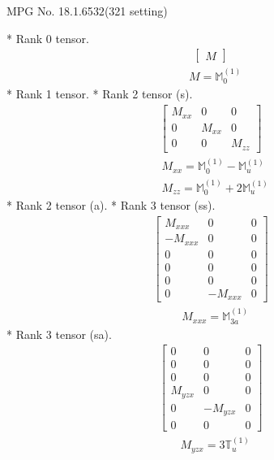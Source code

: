 \documentclass[fleqn,8pt,landscape]{jsarticle}
\begin{document}
\setcounter{MaxMatrixCols}{32}

\renewcommand{\tablename}{Table~}
\renewcommand{\figurename}{Figure~}
\begin{center}
\LARGE
MPG No. 18.1.65\quad$32$\quad(321 setting)
\end{center}
* Rank 0 tensor.
\begin{align*}
\begin{bmatrix} M \end{bmatrix}
\end{align*}
\begin{align*}
& M = \mathbb{M}_{0}^{(1)}
\end{align*}
* Rank 1 tensor.
* Rank 2 tensor (s).
\begin{align*}
\begin{bmatrix} M_{xx} & 0 & 0 \\ 0 & M_{xx} & 0 \\ 0 & 0 & M_{zz} \end{bmatrix}
\end{align*}
\begin{align*}
& M_{xx} = \mathbb{M}_{0}^{(1)} - \mathbb{M}_{u}^{(1)} \\
& M_{zz} = \mathbb{M}_{0}^{(1)} + 2 \mathbb{M}_{u}^{(1)}
\end{align*}
* Rank 2 tensor (a).
* Rank 3 tensor (ss).
\begin{align*}
\begin{bmatrix} M_{xxx} & 0 & 0 \\ - M_{xxx} & 0 & 0 \\ 0 & 0 & 0 \\ 0 & 0 & 0 \\ 0 & 0 & 0 \\ 0 & - M_{xxx} & 0 \end{bmatrix}
\end{align*}
\begin{align*}
& M_{xxx} = \mathbb{M}_{3a}^{(1)}
\end{align*}
* Rank 3 tensor (sa).
\begin{align*}
\begin{bmatrix} 0 & 0 & 0 \\ 0 & 0 & 0 \\ 0 & 0 & 0 \\ M_{yzx} & 0 & 0 \\ 0 & - M_{yzx} & 0 \\ 0 & 0 & 0 \end{bmatrix}
\end{align*}
\begin{align*}
& M_{yzx} = 3 \mathbb{T}_{u}^{(1)}
\end{align*}
\end{document}
